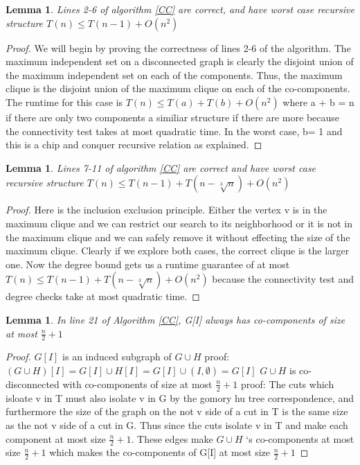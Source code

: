\documentclass[12pt]{article}
\newtheorem{lem}[thm]{Lemma}
\begin{document}
\begin{lem}Lines 2-6 of algorithm \ref{CC} are correct, and have worst case recursive structure $T(n) \le T(n-1) + O(n^2)$ \end{lem}
\begin{proof} We will begin by proving the correctness of lines 2-6 of the algorithm. The maximum independent set on a disconnected graph is clearly the disjoint union of the maximum independent set on each of the components. Thus, the maximum clique  is the disjoint union of the maximum clique on each of the co-components. The runtime for this case is $T(n) \le T(a) + T(b) + O(n^2)$ where a + b = n if there are only two components a similiar structure if there are more because the connectivity test takes at most quadratic time. In the worst case,  b= 1 and this is a chip and conquer recursive relation as explained.
\end{proof}
\begin{lem}Lines 7-11 of algorithm \ref{CC} are correct and have worst case recursive structure $T(n) \le T(n-1) + T(n-\sqrt[3]{n}) + O(n^2)$ \end{lem}
\begin{proof}
Here is the inclusion exclusion principle. Either the vertex v is in the maximum clique and we can restrict our search to its neighborhood or it is not in the maximum clique and we can safely remove it without effecting the size of the maximum clique. Clearly if we explore both cases, the correct clique is the larger one. Now the degree bound gets us a runtime guarantee of at most $T(n) \le T(n-1) + T(n-\sqrt[3]{n}) + O(n^2)$ because the connectivity test and degree checks take at most quadratic time. 
\end{proof}
\begin{lem} \label{size} In line 21 of Algorithm \ref{CC}, G[I] always has co-components of size at most $\frac{n}{2}+ 1$\end{lem}
\begin{proof}
$G[I]$ is an induced subgraph of $G\cup H$ proof:$ (G \cup H) [I] = G[I] \cup H[I] = G[I] \cup (I,\emptyset) = G[I]$
$G\cup H$ is co-disconnected with co-components of size at most $\frac{n}{2}+ 1$ proof: The cuts which isloate v in T must also isolate v in G by the gomory hu tree correspondence, and furthermore the size of the graph on the not v side of a cut in T is the same size as the not v side of a cut in G. Thus since the cuts isolate v in T and make each component at most size $\frac{n}{2}+ 1$. These edges make $G \cup H$ `s co-components at most size $\frac{n}{2}+ 1$ which makes the co-components of G[I] at most size $\frac{n}{2}+ 1$
\end{proof}
\end{document}
